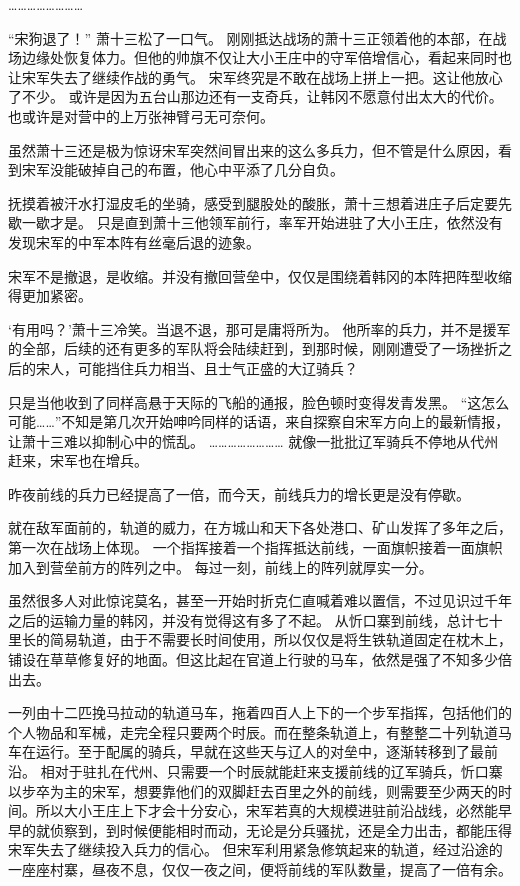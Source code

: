 ……………………

“宋狗退了！”
萧十三松了一口气。
刚刚抵达战场的萧十三正领着他的本部，在战场边缘处恢复体力。但他的帅旗不仅让大小王庄中的守军倍增信心，看起来同时也让宋军失去了继续作战的勇气。
宋军终究是不敢在战场上拼上一把。这让他放心了不少。
或许是因为五台山那边还有一支奇兵，让韩冈不愿意付出太大的代价。也或许是对营中的上万张神臂弓无可奈何。

虽然萧十三还是极为惊讶宋军突然间冒出来的这么多兵力，但不管是什么原因，看到宋军没能破掉自己的布置，他心中平添了几分自负。

抚摸着被汗水打湿皮毛的坐骑，感受到腿股处的酸胀，萧十三想着进庄子后定要先歇一歇才是。
只是直到萧十三他领军前行，率军开始进驻了大小王庄，依然没有发现宋军的中军本阵有丝毫后退的迹象。

宋军不是撤退，是收缩。并没有撤回营垒中，仅仅是围绕着韩冈的本阵把阵型收缩得更加紧密。

‘有用吗？’萧十三冷笑。当退不退，那可是庸将所为。
他所率的兵力，并不是援军的全部，后续的还有更多的军队将会陆续赶到，到那时候，刚刚遭受了一场挫折之后的宋人，可能挡住兵力相当、且士气正盛的大辽骑兵？

只是当他收到了同样高悬于天际的飞船的通报，脸色顿时变得发青发黑。
“这怎么可能……”不知是第几次开始呻吟同样的话语，来自探察自宋军方向上的最新情报，让萧十三难以抑制心中的慌乱。
……………………
就像一批批辽军骑兵不停地从代州赶来，宋军也在增兵。

昨夜前线的兵力已经提高了一倍，而今天，前线兵力的增长更是没有停歇。

就在敌军面前的，轨道的威力，在方城山和天下各处港口、矿山发挥了多年之后，第一次在战场上体现。
一个指挥接着一个指挥抵达前线，一面旗帜接着一面旗帜加入到营垒前方的阵列之中。
每过一刻，前线上的阵列就厚实一分。

虽然很多人对此惊诧莫名，甚至一开始时折克仁直喊着难以置信，不过见识过千年之后的运输力量的韩冈，并没有觉得这有多了不起。
从忻口寨到前线，总计七十里长的简易轨道，由于不需要长时间使用，所以仅仅是将生铁轨道固定在枕木上，铺设在草草修复好的地面。但这比起在官道上行驶的马车，依然是强了不知多少倍出去。

一列由十二匹挽马拉动的轨道马车，拖着四百人上下的一个步军指挥，包括他们的个人物品和军械，走完全程只要两个时辰。而在整条轨道上，有整整二十列轨道马车在运行。至于配属的骑兵，早就在这些天与辽人的对垒中，逐渐转移到了最前沿。
相对于驻扎在代州、只需要一个时辰就能赶来支援前线的辽军骑兵，忻口寨以步卒为主的宋军，想要靠他们的双脚赶去百里之外的前线，则需要至少两天的时间。所以大小王庄上下才会十分安心，宋军若真的大规模进驻前沿战线，必然能早早的就侦察到，到时候便能相时而动，无论是分兵骚扰，还是全力出击，都能压得宋军失去了继续投入兵力的信心。
但宋军利用紧急修筑起来的轨道，经过沿途的一座座村寨，昼夜不息，仅仅一夜之间，便将前线的军队数量，提高了一倍有余。

